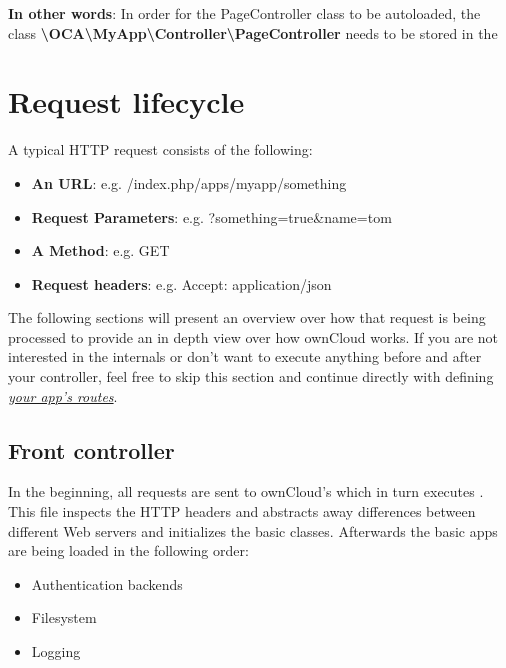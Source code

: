 \documentclass[letterpaper,10pt,english]{sphinxmanual}
\begin{document}
\textbf{In other words}: In order for the PageController class to be autoloaded, the class \textbf{\textbackslash{}OCA\textbackslash{}MyApp\textbackslash{}Controller\textbackslash{}PageController} needs to be stored in the 


\section{Request lifecycle}
\label{app/request:request-lifecycle}\label{app/request::doc}
A typical HTTP request consists of the following:
\begin{itemize}
\item {} 
\textbf{An URL}: e.g. /index.php/apps/myapp/something

\item {} 
\textbf{Request Parameters}: e.g. ?something=true\&name=tom

\item {} 
\textbf{A Method}: e.g. GET

\item {} 
\textbf{Request headers}: e.g. Accept: application/json

\end{itemize}

The following sections will present an overview over how that request is being processed to provide an in depth view over how ownCloud works. If you are not interested in the internals or don't want to execute anything before and after your controller, feel free to skip this section and continue directly with defining {\hyperref[app/routes::doc]{\emph{\emph{your app's routes}}}}.


\subsection{Front controller}
\label{app/request:front-controller}
In the beginning, all requests are sent to ownCloud's  which in turn executes . This file inspects the HTTP headers and abstracts away differences between different Web servers and initializes the basic classes. Afterwards the basic apps are being loaded in the following order:
\begin{itemize}
\item {} 
Authentication backends

\item {} 
Filesystem

\item {} 
Logging

\end{itemize}
\end{document}
